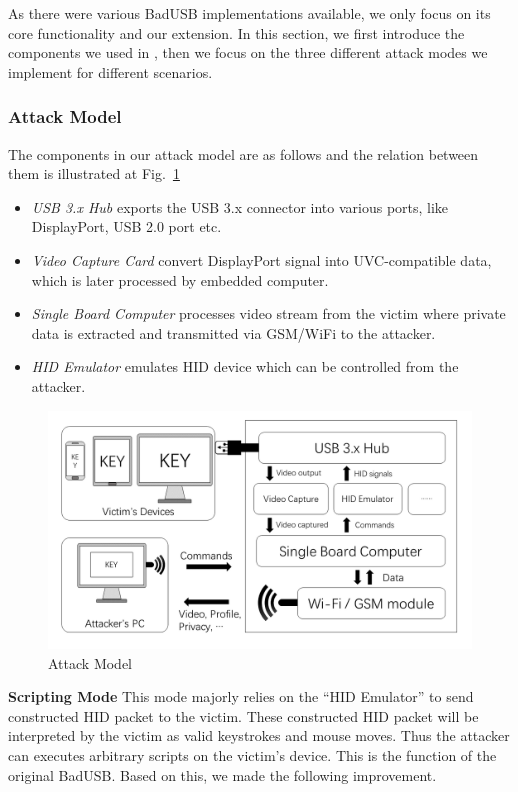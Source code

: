 As there were various BadUSB implementations available, we only focus on its core functionality and our extension. In this section, we first introduce the components we used in \tool, then we focus on the three different attack modes we implement  for different scenarios.

\subsubsection{Attack Model}
The components in our attack model are as follows and the relation between them is illustrated at Fig.~\ref{fig:attack_model}
\begin{itemize}
	\item\textit{USB 3.x Hub} exports the USB 3.x connector into various ports, like DisplayPort, USB 2.0 port etc.
	\item\textit{Video Capture Card} convert DisplayPort signal into UVC-compatible data, which is later processed by embedded computer.
	\item\textit{Single Board Computer} processes video stream from the victim where private data is extracted and transmitted via GSM/WiFi to the attacker.
	\item\textit{HID Emulator} emulates HID device which can be controlled from the attacker.
\end{itemize}
\begin{figure}[t]
	\centering
	\includegraphics[width=\linewidth]{./Figs/attack_model.png}
	\caption{Attack Model}%
	\label{fig:attack_model}
\end{figure}
\textbf{Scripting Mode} This mode majorly relies on the ``HID Emulator'' to send constructed HID packet to the victim. These constructed HID packet will be interpreted by the victim as valid keystrokes and mouse moves. Thus the attacker can executes arbitrary scripts on the victim's device. This is the function of the original BadUSB. Based on this, we made the following improvement.

